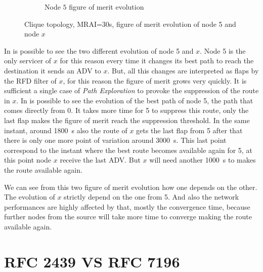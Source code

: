 \begin{figure}[h]
\begin{subfigure}[b]{0.494\textwidth}
         \caption{Node $5$ figure of merit evolution}
         \label{fig:clique_node5_30}
     \end{subfigure}
        \caption{Clique topology, MRAI=30s, figure of merit evolution
		of node \num{5} and node $x$ }
        \label{fig:RFD_2439_figure_of_merit}
\end{figure}

In  is possible to see the two different
evolution of node \num{5} and $x$.
Node \num{5} is the only servicer of $x$ for this reason every time it changes
its best path to reach the destination it sends an \ac{ADV} to $x$.
But, all this changes are interpreted as flaps by the \ac{RFD} filter of $x$,
for this reason the figure of merit grows very quickly.
It is sufficient a single case of \textit{Path Exploration} to provoke the
suppression of the route in $x$.
In  is possible to see the evolution of the best path
of node \num{5}, the path that comes directly from \num{0}.
It takes more time for \num{5} to suppress this route, only the last flap
makes the figure of merit reach the suppression threshold.
In the same instant, around \SI{1800}{\second} also the route of $x$ gets the
last flap from \num{5} after that there is only one more point of variation
around \SI{3000}{\second}.
This last point correspond to the instant where the best route becomes available
again for \num{5}, at this point node $x$ receive the last \ac{ADV}.
But $x$ will need another \SI{1000}{\second} to makes the route available again.

We can see from this two figure of merit evolution how one depends on the other.
The evolution of $x$ strictly depend on the one from \num{5}.
And also the network performances are highly affected by that, mostly the convergence
time, because further nodes from the source will take more time to converge making
the route available again.

\section{RFC 2439 VS RFC 7196}
\label{sec:rfd_2439_Vs_7196}



